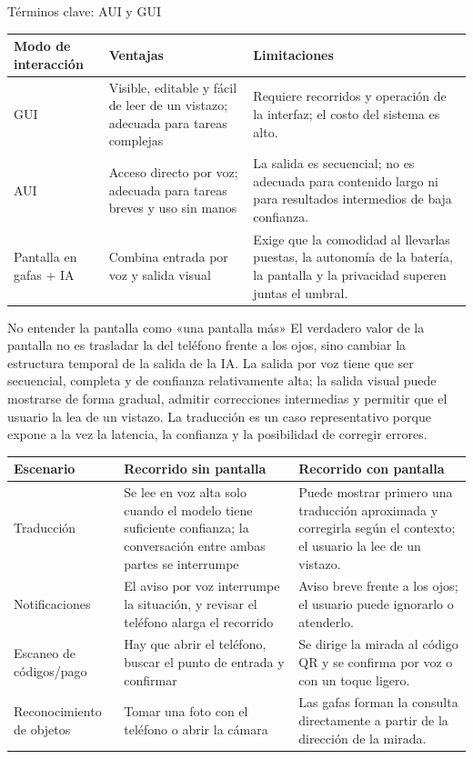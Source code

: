 \documentclass[a4paper]{article}
\begin{document}
\begin{knowledgebox}{Términos clave: AUI y GUI}
\noindent\begin{tabularx}{\textwidth}{p{}p{}X}
\toprule
Modo de interacción & Ventajas & Limitaciones \\
\midrule
GUI & Visible, editable y fácil de leer de un vistazo; adecuada para tareas complejas & Requiere recorridos y operación de la interfaz; el costo del sistema es alto. \\
AUI & Acceso directo por voz; adecuada para tareas breves y uso sin manos & La salida es secuencial; no es adecuada para contenido largo ni para resultados intermedios de baja confianza. \\
Pantalla en gafas + IA & Combina entrada por voz y salida visual & Exige que la comodidad al llevarlas puestas, la autonomía de la batería, la pantalla y la privacidad superen juntas el umbral. \\
\bottomrule
\end{tabularx}
\end{knowledgebox}

\begin{warningbox}{No entender la pantalla como «una pantalla más»}
El verdadero valor de la pantalla no es trasladar la del teléfono frente a los ojos, sino cambiar la estructura temporal de la salida de la IA. La salida por voz tiene que ser secuencial, completa y de confianza relativamente alta; la salida visual puede mostrarse de forma gradual, admitir correcciones intermedias y permitir que el usuario la lea de un vistazo. La traducción es un caso representativo porque expone a la vez la latencia, la confianza y la posibilidad de corregir errores.
\end{warningbox}

\noindent\begin{tabularx}{\textwidth}{p{}p{}X}
\toprule
Escenario & Recorrido sin pantalla & Recorrido con pantalla \\
\midrule
Traducción & Se lee en voz alta solo cuando el modelo tiene suficiente confianza; la conversación entre ambas partes se interrumpe & Puede mostrar primero una traducción aproximada y corregirla según el contexto; el usuario la lee de un vistazo. \\
Notificaciones & El aviso por voz interrumpe la situación, y revisar el teléfono alarga el recorrido & Aviso breve frente a los ojos; el usuario puede ignorarlo o atenderlo. \\
Escaneo de códigos/pago & Hay que abrir el teléfono, buscar el punto de entrada y confirmar & Se dirige la mirada al código QR y se confirma por voz o con un toque ligero. \\
Reconocimiento de objetos & Tomar una foto con el teléfono o abrir la cámara & Las gafas forman la consulta directamente a partir de la dirección de la mirada. \\
\bottomrule
\end{tabularx}
\end{document}
